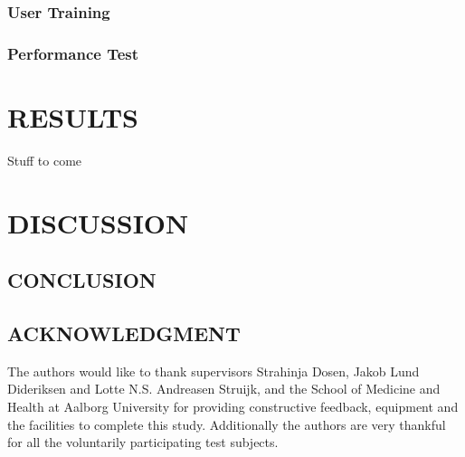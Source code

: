 \begin{multicols}{2}
		\subsubsection*{User Training}
	
	
	\subsubsection*{Performance Test}

	
	
	\section*{RESULTS}%
Stuff to come
	\section*{DISCUSSION}%
	
	
	
	\subsection*{CONCLUSION}%
	
	
	
	
	
	\subsection*{ACKNOWLEDGMENT}
	
	The authors would like to thank supervisors Strahinja Dosen, Jakob Lund Dideriksen and Lotte N.S. Andreasen Struijk, and the School of Medicine and Health at Aalborg University for providing constructive feedback, equipment and the facilities to complete this study. Additionally the authors are  very thankful for all the voluntarily participating test subjects.
	
	

\end{multicols}
